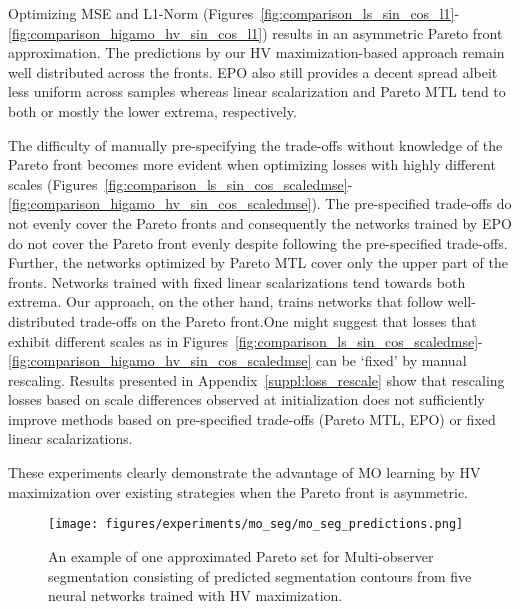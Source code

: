 Optimizing MSE and L1-Norm (Figures~\ref{fig:comparison_ls_sin_cos_l1}-\ref{fig:comparison_higamo_hv_sin_cos_l1}) results in an asymmetric Pareto front approximation. The predictions by our HV maximization-based approach remain well distributed across the fronts. EPO also still provides a decent spread albeit less uniform across samples whereas linear scalarization and Pareto MTL tend to both or mostly the lower extrema, respectively.

The difficulty of manually pre-specifying the trade-offs without knowledge of the Pareto front becomes more evident when optimizing losses with highly different scales (Figures~\ref{fig:comparison_ls_sin_cos_scaledmse}-\ref{fig:comparison_higamo_hv_sin_cos_scaledmse}). The pre-specified trade-offs do not evenly cover the Pareto fronts and consequently the networks trained by EPO do not cover the Pareto front evenly despite following the pre-specified trade-offs. Further, the networks optimized by Pareto MTL cover only the upper part of the fronts. Networks trained with fixed linear scalarizations tend towards both extrema. Our approach, on the other hand, trains networks that follow well-distributed trade-offs on the Pareto front.One might suggest that losses that exhibit different scales as in Figures~\ref{fig:comparison_ls_sin_cos_scaledmse}-\ref{fig:comparison_higamo_hv_sin_cos_scaledmse} can be `fixed' by manual rescaling. Results presented in Appendix~\ref{suppl:loss_rescale} show that rescaling losses based on scale differences observed at initialization does not sufficiently improve methods based on pre-specified trade-offs (Pareto MTL, EPO) or fixed linear scalarizations.

These experiments clearly demonstrate the advantage of MO learning by HV maximization over existing strategies when the Pareto front is asymmetric. 

\begin{figure}[h!]
    \centering
    \texttt{[image: figures/experiments/mo\_seg/mo\_seg\_predictions.png]}
    \caption{An example of one approximated Pareto set for Multi-observer segmentation consisting of predicted segmentation contours from five neural networks trained with HV maximization.}
    \label{fig:mo seg predictions}
\end{figure}

